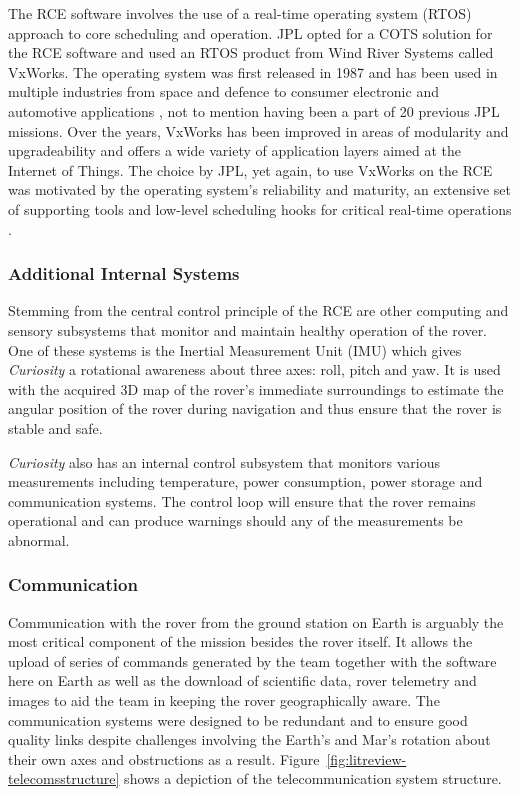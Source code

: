         The RCE software involves the use of a real-time operating system (RTOS) approach to core scheduling and operation. JPL opted for a COTS solution for the RCE software and used an RTOS product from Wind River Systems called VxWorks. The operating system was first released in 1987 and has been used in multiple industries from space and defence to consumer electronic and automotive applications \cite{electronicsdesign2011vxworks}, not to mention having been a part of 20 previous JPL missions. Over the years, VxWorks has been improved in areas of modularity and upgradeability and offers a wide variety of application layers aimed at the Internet of Things. The choice by JPL, yet again, to use VxWorks on the RCE was motivated by the operating system's reliability and maturity, an extensive set of supporting tools and low-level scheduling hooks for critical real-time operations \cite{extremetech2012insidecuriosity}.
        
      \subsubsection{Additional Internal Systems}
        Stemming from the central control principle of the RCE are other computing and sensory subsystems that monitor and maintain healthy operation of the rover. One of these systems is the Inertial Measurement Unit (IMU) which gives \textit{Curiosity} a rotational awareness about three axes: roll, pitch and yaw. It is used with the acquired 3D map of the rover's immediate surroundings to estimate the angular position of the rover during navigation and thus ensure that the rover is stable and safe.
        
        \textit{Curiosity} also has an internal control subsystem that monitors various measurements including temperature, power consumption, power storage and communication systems. The control loop will ensure that the rover remains operational and can produce warnings should any of the measurements be abnormal.
               
      \subsubsection{Communication}
        Communication with the rover from the ground station on Earth is arguably the most critical component of the mission besides the rover itself. It allows the upload of series of commands generated by the team together with the software here on Earth as well as the download of scientific data, rover telemetry and images to aid the team in keeping the rover geographically aware. The communication systems were designed to be redundant and to ensure good quality links despite challenges involving the Earth's and Mar's rotation about their own axes and obstructions as a result. Figure~\ref{fig:litreview-telecomsstructure} shows a depiction of the telecommunication system structure.
        
